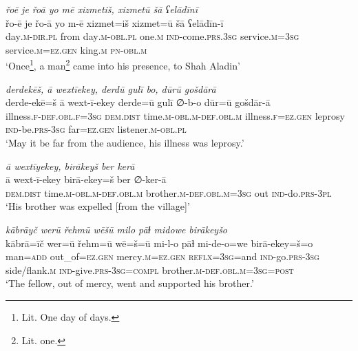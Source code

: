 \ea \label{DG.11}
\textit{řoē je řoā yo mē xizmetiš, xizmetū šā ʕelādīnī} \\ 
\gll řo-ē je řo-ā yo m-ē xizmet=iš xizmet=ū šā ʕelādīn-ī \\ 
 day\textsc{.m}\textsc{-dir}\textsc{.pl} from day\textsc{.m}\textsc{-obl}\textsc{.pl} one\textsc{.m} \textsc{ind-}come\textsc{.prs}\textsc{.3sg} service\textsc{.m}\textsc{=3sg} service\textsc{.m}\textsc{=ez}\textsc{.gen} king\textsc{.m} \textsc{pn}\textsc{-obl}\textsc{.m} \\ 
\glt `Once\footnote{Lit. One day of days.}, a man\footnote{Lit. one.}  came into his presence, to Shah Aladin'
\z 
 
\ea \label{DG.13}
\textit{derdekēš, ā wextīekey, derdū gulī bo, dūrū gošdārā} \\ 
\gll derde-ekē=š ā wext-ī-ekey derde=ū gulī ∅-b-o dūr=ū gošdār-ā \\ 
 illness\textsc{\textsc{.f}}\textsc{-def}\textsc{.obl}\textsc{\textsc{.f}}\textsc{=3sg} \textsc{dem.dist} time\textsc{.m}\textsc{-obl}\textsc{.m}\textsc{-def}\textsc{.obl}\textsc{.m} illness\textsc{\textsc{.f}}\textsc{=ez}\textsc{.gen} leprosy \textsc{ind-}be\textsc{.prs}\textsc{-3sg} far\textsc{=ez}\textsc{.gen} listener\textsc{.m}\textsc{-obl}\textsc{.pl} \\ 
\glt `May it be far from the audience, his illness was leprosy.'
\z 
 
\ea \label{DG.15}
\textit{ā wextīyekey, birākeyš ber kerā} \\ 
\gll ā wext-ī-ekey birā-ekey=š ber ∅-ker-ā \\ 
 \textsc{dem.dist} time\textsc{.m}\textsc{-obl}\textsc{.m}\textsc{-def}\textsc{.obl}\textsc{.m} brother\textsc{.m}\textsc{-def}\textsc{.obl}\textsc{.m}\textsc{=3sg} out \textsc{ind-}do\textsc{.prs}\textsc{-3pl} \\ 
\glt `His brother was expelled [from the village]'
\z 
 
\ea \label{DG.16}
\textit{kābrāyč werū řehmū wēšū milo pāɫ midowe birākeyšo} \\ 
\gll kābrā=īč wer=ū řehm=ū wē=š=ū mi-l-o pāɫ mi-de-o=we birā-ekey=š=o \\ 
 man\textsc{=add} out\_of\textsc{=ez}\textsc{.gen} mercy\textsc{.m}\textsc{=ez}\textsc{.gen} \textsc{reflx}\textsc{=3sg}=and \textsc{ind-}go\textsc{.prs}\textsc{-3sg} side/flank\textsc{.m} \textsc{ind-}give\textsc{.prs}\textsc{-3sg}\textsc{=\textsc{compl}} brother\textsc{.m}\textsc{-def}\textsc{.obl}\textsc{.m}\textsc{=3sg}\textsc{=\textsc{post}} \\ 
\glt `The fellow, out of mercy, went and supported his brother.'
\z 
 
